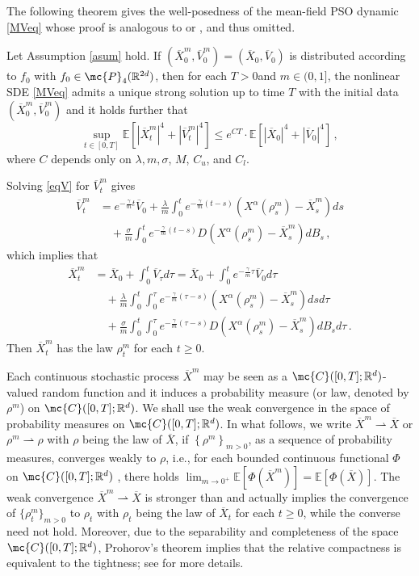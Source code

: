 \documentclass{ims9x6}
\newcommand{\EE}{\mathbb{E}}
\newcommand{\RR}{\mathbb{R}}
\newcommand{\OV}{\overline{V}}
\newcommand{\OX}{\overline{X}}
\begin{document}
The following theorem gives the well-posedness of the mean-field PSO dynamic  \eqref{MVeq} whose proof is  analogous to \cite[Theorem 2.3]{huang2021mean} or \cite[Theorem 3.1]{carrillo2018analytical}, and thus omitted.
\begin{theorem}\label{thm-huang2021mean}
	Let Assumption \ref{asum} hold.  If $(\OX^m_0,\OV^m_0)=(\OX_0,\OV_0)$ is distributed according to $f_0$ with $f_0\in\mc{P}_4(\RR^{2d})$, then for each $T>0$and $m\in(0,1]$, the nonlinear SDE \eqref{MVeq} admits a unique strong solution up to time $T$ with the initial data $(\OX^m_0,\OV^m_0)$ and it holds further that
	\begin{equation}\label{secmen}
	\sup\limits_{t\in[0,T]}\EE\left[|\OX_t^m|^4+|\OV_t^m|^4\right]\leq e^{CT} \cdot \EE\left[ |\OX_0|^4+|\OV_0|^4\right]\,,
	\end{equation}
	where $C$ depends only on $\lambda,m,\sigma$, $M$, $C_u$, and $C_l$.
\end{theorem}
Solving \eqref{eqV} for $\OV_t^m$ gives  
\begin{align*}
\OV_t^m&=e^{-\frac{\gamma}{m}t}\OV_0+\frac{\lambda}{m}\int_0^te^{-\frac{\gamma}{m}(t-s)}(X^{\alpha}(\rho_s^m)-\OX_s^m)ds\\
&\quad +\frac{\sigma}{m}\int_0^te^{-\frac{\gamma}{m}(t-s)}D(X^{\alpha}(\rho_s^m)-\OX_s^m)dB_s\,,
\end{align*}
which implies that
\begin{equation}
\label{onlyX}
\begin{split}
\OX_t^m&=\OX_0+\int_0^t\OV_\tau d\tau=\OX_0+\int_0^t  e^{-\frac{\gamma}{m}\tau}\OV_0d\tau\\
&\quad +\frac{\lambda}{m}\int_0^t\int_0^\tau e^{-\frac{\gamma}{m}(\tau-s)}(X^{\alpha}(\rho_s^m)-\OX_s^m)dsd\tau\\
& \quad +\frac{\sigma}{m}\int_0^t\int_0^\tau e^{-\frac{\gamma}{m}(\tau-s)}D(X^{\alpha}(\rho_s^m)-\OX_s^m)dB_s d\tau\,.
\end{split}
\end{equation}
Then $\OX_t^m$ has the law $\rho^m_t$ for each $t\geq 0$. 

Each continuous stochastic process $\OX^m$ may be seen as a $\mc{C}([0,T];\RR^d)$-valued random function and it induces a probability measure (or law, denoted by $\rho^m$) on $\mc{C}([0,T];\RR^d)$. We shall use the weak convergence in the space of probability measures on $\mc{C}([0,T];\RR^d)$. In what follows,  we write $\OX^m \rightharpoonup \OX$ or $\rho^m \rightharpoonup \rho$ with $\rho$ being the law of $\OX$,  if $\left\{\rho^m\right\}_{m>0}$, as a sequence of probability measures,  converges weakly to $ \rho$, i.e.,
for each bounded continuous functional $\Phi$ on $\mc{C}([0,T];\RR^d)$ , there holds $\lim_{m\rightarrow 0^+}\EE\left[\Phi(\OX^m)\right]= \EE\left[\Phi(\OX)\right]$. The weak convergence $\OX^m \rightharpoonup \OX$ is stronger than and actually implies the convergence of $\{\rho^m_t \}_{m>0}$ to $ \rho_t$ with $\rho_t$ being the law of $\OX_t$ for each $t\geq 0$, while the converse need not hold. Moreover, due to the separability and completeness of the space $\mc{C}([0,T];\RR^d)$,  Prohorov's theorem implies that the relative compactness is equivalent to the tightness; see \cite{billingsley2013convergence} for more details.
\end{document}

